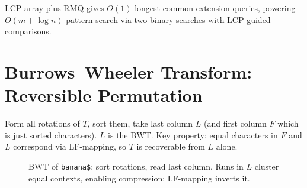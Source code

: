 LCP array plus RMQ gives $O(1)$ longest-common-extension queries, powering $O(m+\log n)$ pattern search via two binary searches with LCP-guided comparisons.

\section{Burrows--Wheeler Transform: Reversible Permutation}
\label{sec:bwt}

Form all rotations of $T$, sort them, take last column $L$ (and first column $F$ which is just sorted characters). $L$ is the BWT. Key property: equal characters in $F$ and $L$ correspond via LF-mapping, so $T$ is recoverable from $L$ alone.

\begin{figure}[h]\centering
{}
\caption{BWT of \texttt{banana\$}: sort rotations, read last column. Runs in $L$ cluster equal contexts, enabling compression; LF-mapping inverts it.}
\label{fig:bwt}
\end{figure}

